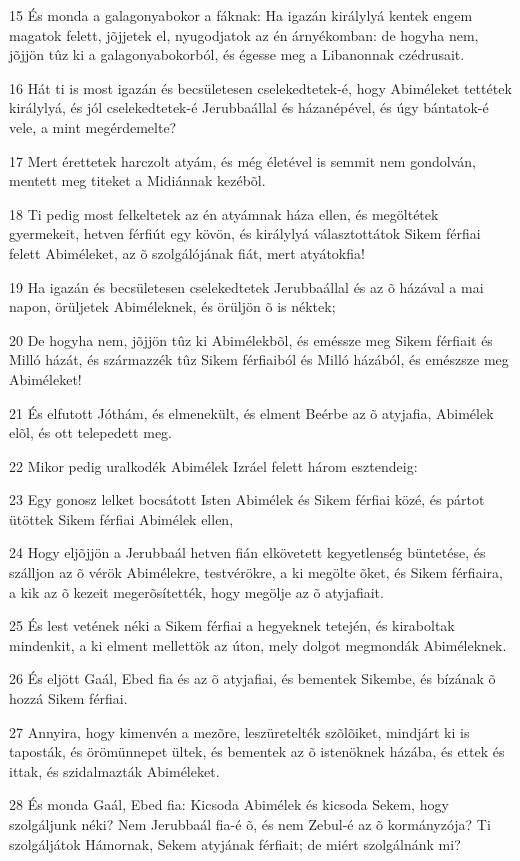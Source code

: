 \par 15 És monda a galagonyabokor a fáknak: Ha igazán királylyá kentek engem magatok felett, jõjjetek el, nyugodjatok az én árnyékomban: de hogyha nem, jõjjön tûz ki a galagonyabokorból, és égesse meg a Libanonnak czédrusait.
\par 16 Hát ti is most igazán és becsületesen cselekedtetek-é, hogy Abiméleket tettétek királylyá, és jól cselekedtetek-é Jerubbaállal és házanépével, és úgy bántatok-é vele, a mint megérdemelte?
\par 17 Mert érettetek harczolt atyám, és még életével is semmit nem gondolván, mentett meg titeket a Midiánnak kezébõl.
\par 18 Ti pedig most felkeltetek az én atyámnak háza ellen, és megöltétek gyermekeit, hetven férfiút egy kövön, és királylyá választottátok Sikem férfiai felett Abiméleket, az õ szolgálójának fiát, mert atyátokfia!
\par 19 Ha igazán és becsületesen cselekedtetek Jerubbaállal és az õ házával a mai napon, örüljetek Abiméleknek, és örüljön õ is néktek;
\par 20 De hogyha nem, jõjjön tûz ki Abimélekbõl, és eméssze meg Sikem férfiait és Milló házát, és származzék tûz Sikem férfiaiból és Milló házából, és emészsze meg Abiméleket!
\par 21 És elfutott Jóthám, és elmenekült, és elment Beérbe az õ atyjafia, Abimélek elõl, és ott telepedett meg.
\par 22 Mikor pedig uralkodék Abimélek Izráel felett három esztendeig:
\par 23 Egy gonosz lelket bocsátott Isten Abimélek és Sikem férfiai közé, és pártot ütöttek Sikem férfiai Abimélek ellen,
\par 24 Hogy eljõjjön a Jerubbaál hetven fián elkövetett kegyetlenség büntetése, és szálljon az õ vérök Abimélekre, testvérökre, a ki megölte õket, és Sikem férfiaira, a kik az õ kezeit megerõsítették, hogy megölje az õ atyjafiait.
\par 25 És lest vetének néki a Sikem férfiai a hegyeknek tetején, és kiraboltak mindenkit, a ki elment mellettök az úton, mely dolgot megmondák Abiméleknek.
\par 26 És eljött Gaál, Ebed fia és az õ atyjafiai, és bementek Sikembe, és bízának õ hozzá Sikem férfiai.
\par 27 Annyira, hogy kimenvén a mezõre, leszüretelték szõlõiket, mindjárt ki is taposták, és örömünnepet ültek, és bementek az õ istenöknek házába, és ettek és ittak, és szidalmazták Abiméleket.
\par 28 És monda Gaál, Ebed fia: Kicsoda Abimélek és kicsoda Sekem, hogy szolgáljunk néki? Nem Jerubbaál fia-é õ, és nem Zebul-é az õ kormányzója? Ti szolgáljátok Hámornak, Sekem atyjának férfiait; de miért szolgálnánk mi?
